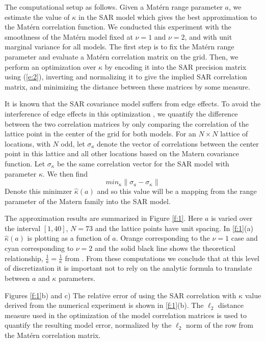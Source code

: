 \documentclass[review]{elsarticle}
\begin{document}
The  computational setup as follows. Given a Mat\'ern range parameter $a$, we estimate the value of  $\kappa$ in the SAR model which gives the best approximation to the Mat\'ern correlation function.  We conducted this experiment with the smoothness of the Mat\'ern model fixed at $\nu=1$ and $\nu=2$, and with unit marginal variance for all models. The first step is to fix the Mat\'ern range parameter and evaluate a Mat\'ern correlation matrix on the grid. Then, we perform an optimization over $\kappa$ by encoding it into the SAR precision matrix using (\ref{e:2}), inverting and normalizing it to give the implied SAR correlation matrix, and minimizing the distance between these matrices by some measure.

It is known that the SAR covariance model suffers from edge effects. To avoid the interference of edge effects in this optimization , we quantify the difference between the two correlation matrices by only comparing the correlation of the lattice point  in the center of the grid for both models. 
For an $N \times N$ lattice of locations, with $N$ odd,  let  $\sigma_a$ denote the  vector of correlations between the center point in this lattice  and all other locations based on the Matern covariance function.  Let  $\sigma_\kappa$ be the same  correlation vector for the SAR model with parameter $\kappa$.  We then find \[ min_{\kappa} \| \sigma_a - \sigma_\kappa \| \]
Denote this minimzer $\hat{\kappa}( a)$ and so this value will be a mapping from the range parameter
of the Matern family into the SAR model. 


The approximation results are summarized in Figure \ref{f:1}. Here $a$ is varied over the interval $[1, 40]$, $N=73$ and the lattice points have unit spacing.  In \ref{f:1}(a)  $\hat{\kappa}( a)$  is plotting as a function of $a$. Orange corresponding to the $\nu=1$ case and cyan corresponding to $\nu=2$ and the solid black line shows the theoretical relationship, $\frac{1}{a} = \frac{1}{\kappa}$ from \cite{lindgren2011explicit}.  From these computations we conclude that at this level of discretization it is important not to rely on the analytic formula to translate between $a$ and $\kappa$ parameters. 


Figures   \ref{f:1}b) and c)  The relative error of using the SAR correlation with $\kappa$ value derived from the numerical experiment is shown in \ref{f:1}(b). The $\ell_2$ distance measure used in the optimization of the model correlation matrices is used to quantify the resulting model error, normalized by the $\ell_2$ norm of the row from the Mat\'ern correlation matrix.
\end{document}
